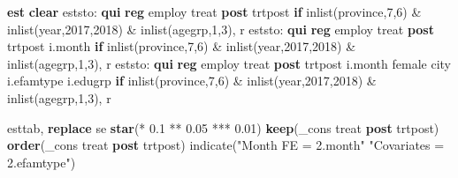 \documentclass[
  letterpaper,
  DIV=11,
  numbers=noendperiod]{scrartcl}
\newenvironment{Shaded}{\begin{snugshade}}{\end{snugshade}}
\newcommand{\DataTypeTok}[1]{\textcolor[rgb]{0.68,0.00,0.00}{#1}}
\newcommand{\FunctionTok}[1]{\textcolor[rgb]{0.28,0.35,0.67}{#1}}
\newcommand{\KeywordTok}[1]{\textcolor[rgb]{0.00,0.23,0.31}{\textbf{#1}}}
\newcommand{\NormalTok}[1]{\textcolor[rgb]{0.00,0.23,0.31}{#1}}
\newcommand{\StringTok}[1]{\textcolor[rgb]{0.13,0.47,0.30}{#1}}
\begin{document}
\begin{Shaded}
\begin{Highlighting}[]
\KeywordTok{est} \KeywordTok{clear}
\NormalTok{eststo: }\KeywordTok{qui} \KeywordTok{reg}\NormalTok{ employ treat }\KeywordTok{post}\NormalTok{ trtpost }\KeywordTok{if} \FunctionTok{inlist}\NormalTok{(province,7,6) \& }\FunctionTok{inlist}\NormalTok{(}\FunctionTok{year}\NormalTok{,2017,2018) \& }\FunctionTok{inlist}\NormalTok{(agegrp,1,3), }\FunctionTok{r}
\NormalTok{eststo: }\KeywordTok{qui} \KeywordTok{reg}\NormalTok{ employ treat }\KeywordTok{post}\NormalTok{ trtpost i.}\FunctionTok{month} \KeywordTok{if} \FunctionTok{inlist}\NormalTok{(province,7,6) \& }\FunctionTok{inlist}\NormalTok{(}\FunctionTok{year}\NormalTok{,2017,2018) \& }\FunctionTok{inlist}\NormalTok{(agegrp,1,3), }\FunctionTok{r}
\NormalTok{eststo: }\KeywordTok{qui} \KeywordTok{reg}\NormalTok{ employ treat }\KeywordTok{post}\NormalTok{ trtpost i.}\FunctionTok{month}\NormalTok{ female city i.efamtype i.edugrp }\KeywordTok{if} \FunctionTok{inlist}\NormalTok{(province,7,6) \& }\FunctionTok{inlist}\NormalTok{(}\FunctionTok{year}\NormalTok{,2017,2018) \& }\FunctionTok{inlist}\NormalTok{(agegrp,1,3), }\FunctionTok{r}

\NormalTok{esttab, }\KeywordTok{replace}\NormalTok{ se }\KeywordTok{star}\NormalTok{(* 0.1 ** 0.05 *** 0.01) }\KeywordTok{keep}\NormalTok{(}\DataTypeTok{\_cons}\NormalTok{ treat }\KeywordTok{post}\NormalTok{ trtpost) }\KeywordTok{order}\NormalTok{(}\DataTypeTok{\_cons}\NormalTok{ treat }\KeywordTok{post}\NormalTok{ trtpost) indicate(}\StringTok{"Month FE = 2.month"} \StringTok{"Covariates = 2.efamtype"}\NormalTok{) }
\end{Highlighting}
\end{Shaded}
\end{document}
